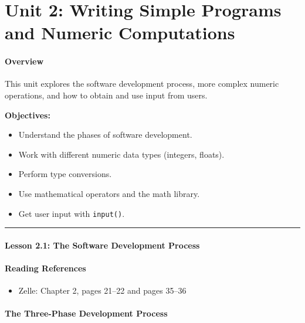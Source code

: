 \documentclass[
  justified,
  openright,
]{tufte-book}
\let\subsection\paragraph
\let\paragraph\paragraph
\let\subsection\paragraph
\let\paragraph\paragraph
\providecommand{\tightlist}{%
  \setlength{\itemsep}{0pt}\setlength{\parskip}{0pt}}
\begin{document}
\newpage

\section{Unit 2: Writing Simple Programs and Numeric
Computations}\label{unit-2-writing-simple-programs-and-numeric-computations}

\subsection{Overview}\label{overview-2}

This unit explores the software development process, more complex
numeric operations, and how to obtain and use input from users.

\textbf{Objectives:}

\begin{itemize}
\tightlist
\item
  Understand the phases of software development.
\item
  Work with different numeric data types (integers, floats).
\item
  Perform type conversions.
\item
  Use mathematical operators and the math library.
\item
  Get user input with \texttt{input()}.
\end{itemize}

\begin{center}\rule{0.5\linewidth}{0.5pt}\end{center}

\subsection{Lesson 2.1: The Software Development
Process}\label{lesson-2.1-the-software-development-process-1}

\subsection{Reading References}\label{reading-references-7}

\begin{itemize}
\tightlist
\item
  Zelle: Chapter 2, pages 21--22 and pages 35--36
\end{itemize}

\subsection{The Three-Phase Development
Process}\label{the-three-phase-development-process}
\end{document}
